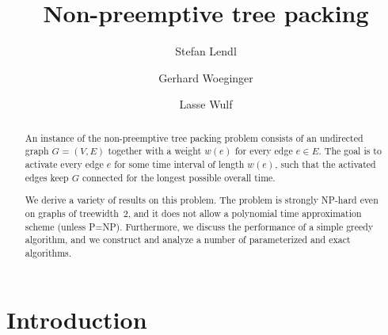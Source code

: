 \documentclass[runningheads]{llncs}
\begin{document}
\title{Non-preemptive tree packing}

\author{Stefan Lendl \and
Gerhard Woeginger \and
Lasse Wulf
}

%
\maketitle 

\begin{abstract}
An instance of the non-preemptive tree packing problem consists of an undirected graph $G=(V,E)$ 
together with a weight $w(e)$ for every edge $e\in E$.
The goal is to activate every edge $e$ for some time interval of length $w(e)$, such that the 
activated edges keep $G$ connected for the longest possible overall time.

We derive a variety of results on this problem.
The problem is strongly NP-hard even on graphs of treewidth~$2$, and it does not allow a polynomial
time approximation scheme (unless P=NP).
Furthermore, we discuss the performance of a simple greedy algorithm, and we construct and analyze
a number of parameterized and exact algorithms.
\end{abstract}


\section{Introduction}
\end{document}
